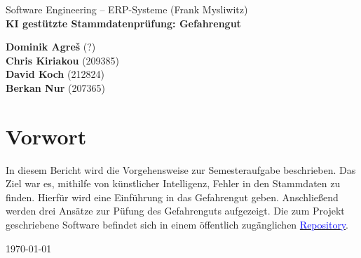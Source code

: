 \begin{titlepage}
    \begin{flushleft}
        Software Engineering -- ERP-Systeme (Frank Mysliwitz)\\

        \huge
        \textbf{KI gestützte Stammdatenprüfung: Gefahrengut}\\
        \vspace{1,5cm}

        \Large
        \textbf{Dominik Agreš} {\small (?)}\\
        \textbf{Chris Kiriakou} {\small (209385)}\\
        \textbf{David Koch} {\small (212824)}\\
        \textbf{Berkan Nur} {\small (207365)}\\
        \vspace{1,5cm}
        
        \large
        \section*{Vorwort}
        In diesem Bericht wird die Vorgehensweise zur Semesteraufgabe beschrieben.
        Das Ziel war es, mithilfe von künstlicher Intelligenz, Fehler in den Stammdaten zu
        finden. Hierfür wird eine Einführung in das Gefahrengut geben. Anschließend werden
        drei Ansätze zur Püfung des Gefahrenguts aufgezeigt. 
        Die zum Projekt geschriebene Software befindet sich in einem öffentlich 
        zugänglichen \href{https://github.com/ckiri/gg}{\textcolor{blue}{Repository}}.\\

        \vspace{2,5cm}

        \today \\

        \vspace{3,5cm}
    \end{flushleft}
\end{titlepage}
